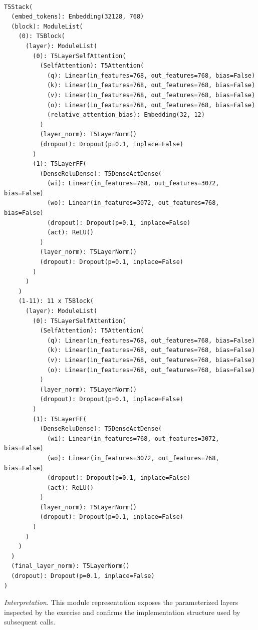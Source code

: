\documentclass[../labs.tex]{subfiles}
\begin{document}
\hypertarget{res:lab02-text-01-t5-ipynb-57-72309e25e574}{}

\begin{lstlisting}[basicstyle=\ttfamily\scriptsize,breaklines=true,breakatwhitespace=false,columns=fullflexible,keepspaces=true]

T5Stack(
  (embed_tokens): Embedding(32128, 768)
  (block): ModuleList(
    (0): T5Block(
      (layer): ModuleList(
        (0): T5LayerSelfAttention(
          (SelfAttention): T5Attention(
            (q): Linear(in_features=768, out_features=768, bias=False)
            (k): Linear(in_features=768, out_features=768, bias=False)
            (v): Linear(in_features=768, out_features=768, bias=False)
            (o): Linear(in_features=768, out_features=768, bias=False)
            (relative_attention_bias): Embedding(32, 12)
          )
          (layer_norm): T5LayerNorm()
          (dropout): Dropout(p=0.1, inplace=False)
        )
        (1): T5LayerFF(
          (DenseReluDense): T5DenseActDense(
            (wi): Linear(in_features=768, out_features=3072, bias=False)
            (wo): Linear(in_features=3072, out_features=768, bias=False)
            (dropout): Dropout(p=0.1, inplace=False)
            (act): ReLU()
          )
          (layer_norm): T5LayerNorm()
          (dropout): Dropout(p=0.1, inplace=False)
        )
      )
    )
    (1-11): 11 x T5Block(
      (layer): ModuleList(
        (0): T5LayerSelfAttention(
          (SelfAttention): T5Attention(
            (q): Linear(in_features=768, out_features=768, bias=False)
            (k): Linear(in_features=768, out_features=768, bias=False)
            (v): Linear(in_features=768, out_features=768, bias=False)
            (o): Linear(in_features=768, out_features=768, bias=False)
          )
          (layer_norm): T5LayerNorm()
          (dropout): Dropout(p=0.1, inplace=False)
        )
        (1): T5LayerFF(
          (DenseReluDense): T5DenseActDense(
            (wi): Linear(in_features=768, out_features=3072, bias=False)
            (wo): Linear(in_features=3072, out_features=768, bias=False)
            (dropout): Dropout(p=0.1, inplace=False)
            (act): ReLU()
          )
          (layer_norm): T5LayerNorm()
          (dropout): Dropout(p=0.1, inplace=False)
        )
      )
    )
  )
  (final_layer_norm): T5LayerNorm()
  (dropout): Dropout(p=0.1, inplace=False)
)

\end{lstlisting}

\noindent\emph{Interpretation.} This module representation exposes the parameterized layers inspected by the exercise and confirms the implementation structure used by subsequent calls.
\end{document}
